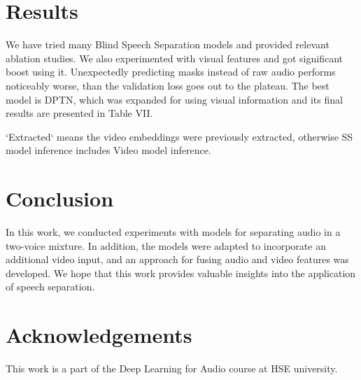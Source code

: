 \documentclass[10pt,conference,compsocconf]{IEEEtran}
\begin{document}
\section{Results}\label{sec:results}
We have tried many Blind Speech Separation models and provided relevant ablation studies. We also experimented with visual features and got significant boost using it. Unexpectedly predicting masks instead of raw audio performs noticeably worse, than the validation loss goes out to the plateau. The best model is DPTN, which was expanded for using visual information and its final results are presented in Table VII.
\begin{table}[H]
\centering
\caption{Final best model AV-DPTN results on validation split}
\end{table}

`Extracted` means the video embeddings were previously extracted, otherwise SS model inference includes Video model inference.

\section{Conclusion}\label{sec:conclusion}
In this work, we conducted experiments with models for separating audio in a two-voice mixture. In addition, the models were adapted to incorporate an additional video input, and an approach for fusing audio and video features was developed. We hope that this work provides valuable insights into the application of speech separation.

\section{Acknowledgements}\label{sec:acknowledgements}
This work is a part of the Deep Learning for Audio course at HSE university. 




\end{document}
